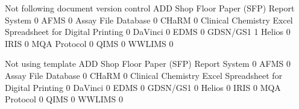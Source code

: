 \documentclass{article}
\begin{document}
\begin{Schunk}
\begin{Soutput}
                                                            Not following document version control
  ADD Shop Floor Paper (SFP) Report System                                                       0
  AFMS                                                                                           0
  Assay File Database                                                                            0
  CHaRM                                                                                          0
  Clinical Chemistry Excel Spreadsheet for Digital Printing                                      0
  DaVinci                                                                                        0
  EDMS                                                                                           0
  GDSN/GS1                                                                                       1
  Helios                                                                                         0
  IRIS                                                                                           0
  MQA Protocol                                                                                   0
  QIMS                                                                                           0
  WWLIMS                                                                                         0
                                                           
                                                            Not using template
  ADD Shop Floor Paper (SFP) Report System                                   0
  AFMS                                                                       0
  Assay File Database                                                        0
  CHaRM                                                                      0
  Clinical Chemistry Excel Spreadsheet for Digital Printing                  0
  DaVinci                                                                    0
  EDMS                                                                       0
  GDSN/GS1                                                                   0
  Helios                                                                     0
  IRIS                                                                       0
  MQA Protocol                                                               0
  QIMS                                                                       0
  WWLIMS                                                                     0
                                                           

\end{Soutput}
\end{Schunk}
\end{document}
